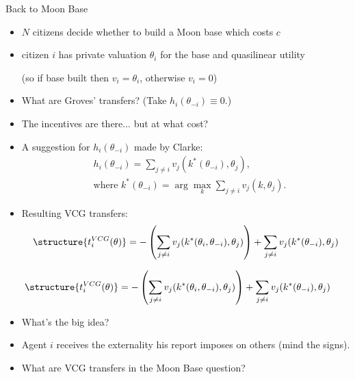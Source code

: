 \documentclass[english]{beamer}		%
\def\lyxframeend{} %
\begin{document}
\begin{exampleblock}{Back to Moon Base}
	\begin{itemize}
		\item $N$ citizens decide whether to build a Moon base which costs $c$
		\item citizen $i$ has private valuation $\theta_{i}$ for the base and quasilinear utility
		
		(so if base built then $v_i = \theta_i$, otherwise $v_i = 0$)
	\end{itemize}
\end{exampleblock}
\begin{itemize}
	\item What are Groves' transfers{\tiny\texttrademark}? (Take $h_i(\theta_{-i}) \equiv 0$.)
	\pause
	\item The incentives are there... but at what cost?
\end{itemize}
\lyxframeend


\begin{itemize}
	\item A suggestion for $h_i(\theta_{-i})$ made by Clarke:
	\vspace{-0.5em}\begin{align*}
	&h_{i}(\theta_{-i})=\sum_{j\neq i} v_{j}(k^*(\theta_{-i}),\theta_{j}),
	\\ &\text{where } k^*(\theta_{-i}) = \arg\max_{k} \sum_{j\neq i}v_{j}(k,\theta_{j}).
	\end{align*}\vspace{-1em}
	\pause
	\item Resulting \alert{VCG transfers}:
	\vspace{-0.5em}\begin{align*}
	\structure{ t_{i}^{VCG}(\theta) } = -\left(\sum_{j\neq i} v_{j}(k^*(\theta_i, \theta_{-i}), \theta_{j}) \right) + \sum_{j\neq i} v_{j}(k^*(\theta_{-i}), \theta_{j})
	\end{align*}\vspace{-1em}
\end{itemize}
\lyxframeend


\vspace{-0.5em}\begin{align*}
\structure{ t_{i}^{VCG}(\theta) } = -\left(\sum_{j\neq i} v_{j}(k^*(\theta_i, \theta_{-i}), \theta_{j}) \right) + \sum_{j\neq i} v_{j}(k^*(\theta_{-i}), \theta_{j})
\end{align*}\vspace{-1em}
\begin{itemize}
	\item What's the big idea?
	\item Agent $i$ receives the externality his report imposes on others (mind the signs).
	\item What are VCG transfers in the Moon Base question?
\end{itemize}
\lyxframeend
\end{document}
